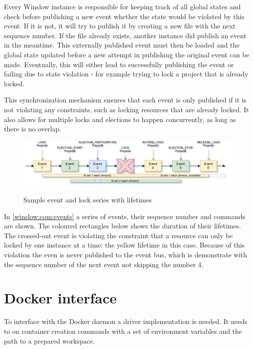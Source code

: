 Every Winslow instance is responsible for keeping track of all global states and check before publishing a new event whether the state would be violated by this event.
If it is not, it will try to publish it by creating a new file with the next sequence number.
If the file already exists, another instance did publish an event in the meantime.
This externally published event must then be loaded and the global state updated before a new attempt in publishing the original event can be made.
Eventually, this will either lead to successfully publishing the event or failing due to state violation - for example trying to lock a project that is already locked.


This synchronization mechanism ensures that each event is only published if it is not violating any constraints, such as locking resources that are already locked.
It also allows for multiple locks and elections to happen concurrently, as long as there is no overlap.

\begin{figure}[H]
	\centering
	\includegraphics[width=1.0\textwidth]{events.png}
	\label{winslow:com:events}
	\caption{Sample event and lock series with lifetimes}
\end{figure}

In \autoref{winslow:com:events} a series of events, their sequence number and commands are shown.
The coloured rectangles below shows the duration of their lifetimes.
The crossed-out event is violating the constraint that a resource can only be locked by one instance at a time: the yellow lifetime in this case.
Because of this violation the even is never published to the event bus, which is demonstrate with the sequence number of the next event not skipping the number 4.

\section{Docker interface}


To interface with the Docker daemon a driver implementation is needed.
It needs to on container creation commands with a set of environment variables and the path to a prepared workspace.

